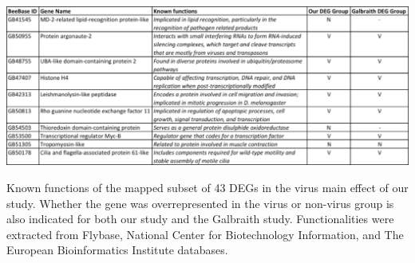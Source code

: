 \documentclass[11pt,a4paper,oldfontcommands,openany]{memoir}
\numberwithin{equation}{section} %
\begin{document}
\begin{table}[H]
  \includegraphics[width=\textwidth]{Images/virusGenes}
  \caption{Known functions of the mapped subset of 43 DEGs in the virus main effect of our study. Whether the gene was overrepresented in the virus or non-virus group is also indicated for both our study and the Galbraith study. Functionalities were extracted from Flybase, National Center for Biotechnology Information, and The European Bioinformatics Institute databases.}
  \label{tbl:virusGenes}
\end{table}


\end{document}

